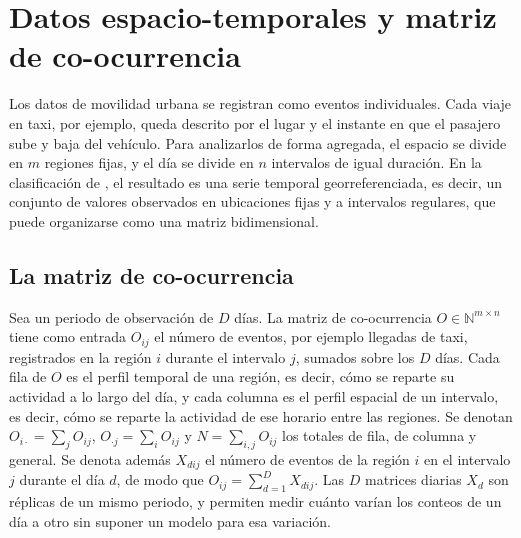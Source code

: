 \section{Datos espacio-temporales y matriz de co-ocurrencia}\label{sec:matriz}

Los datos de movilidad urbana se registran como eventos individuales. Cada viaje
en taxi, por ejemplo, queda descrito por el lugar y el instante en que el pasajero
sube y baja del vehículo. Para analizarlos de forma agregada, el espacio se divide
en $m$ regiones fijas, y el día se divide en $n$ intervalos de igual duración. En la
clasificación de \cite{Wu2020}, el resultado es una serie temporal
georreferenciada, es decir, un conjunto de valores observados en ubicaciones fijas y a
intervalos regulares, que puede organizarse como una matriz bidimensional.

\subsection{La matriz de co-ocurrencia}

Sea un periodo de observación de $D$ días. La matriz de co-ocurrencia
$O \in \mathbb{N}^{m \times n}$ tiene como entrada $O_{ij}$ el número de eventos,
por ejemplo llegadas de taxi, registrados en la región $i$ durante el intervalo
$j$, sumados sobre los $D$ días. Cada fila de $O$ es el perfil temporal de
una región, es decir, cómo se reparte su actividad a lo largo del día, y cada
columna es el perfil espacial de un intervalo, es decir, cómo se reparte la
actividad de ese horario entre las regiones. Se denotan
$O_{i\cdot} = \sum_j O_{ij}$, $O_{\cdot j} = \sum_i O_{ij}$ y $N = \sum_{i,j} O_{ij}$
los totales de fila, de columna y general. Se denota además $X_{dij}$ el número
de eventos de la región $i$ en el intervalo $j$ durante el día $d$, de modo que
$O_{ij} = \sum_{d=1}^{D} X_{dij}$. Las $D$ matrices diarias $X_d$ son réplicas
de un mismo periodo, y permiten medir cuánto varían los conteos de un día a
otro sin suponer un modelo para esa variación.

